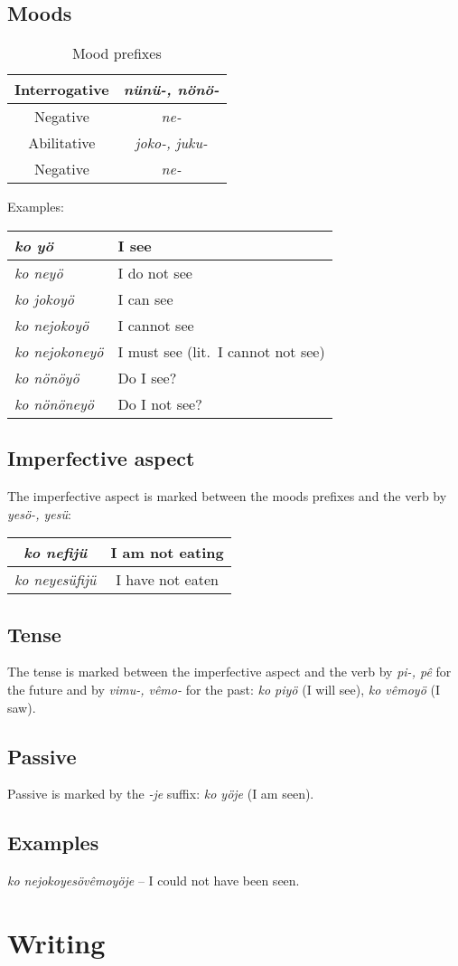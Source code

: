 \documentclass[a4paper]{article}
\begin{document}
\subsection{Moods}

\begin{table}[H]
\begin{tabular}{c | c}
Interrogative & \emph{n\"un\"u-, n\"on\"o-} \\
\hline
Negative & \emph{ne-} \\
\hline
Abilitative & \emph{joko-, juku-} \\
\hline
Negative & \emph{ne-}
\end{tabular}
\caption{Mood prefixes}
\end{table}

Examples:
\begin{table}[H]
\begin{tabular}{l | l}
\emph{ko y\"o} & I see \\
\hline
\emph{ko ney\"o} & I do not see \\
\hline
\emph{ko jokoy\"o} & I can see \\
\hline
\emph{ko nejokoy\"o} & I cannot see \\
\hline
\emph{ko nejokoney\"o} & I must see (lit.\ I cannot not see) \\
\hline
\emph{ko n\"on\"oy\"o} & Do I see? \\
\hline
\emph{ko n\"on\"oney\"o} & Do I not see?
\end{tabular}
\end{table}

\subsection{Imperfective aspect}

The imperfective aspect is marked between the moods prefixes and the verb by
\emph{yes\"o-, yes\"u}: 
\begin{tabular}{c | c}
\emph{ko nefij\"u} & I am not eating \\
\hline
\emph{ko neyes\"ufij\"u} & I have not eaten
\end{tabular} 

\subsection{Tense}

The tense is marked between the imperfective aspect and the verb by
\emph{pi-, p\^e} for the future and by \emph{vimu-, v\^emo-} for the past:
\emph{ko piy\"o} (I will see), \emph{ko v\^emoy\"o} (I saw).

\subsection{Passive}

Passive is marked by the \emph{-je} suffix: \emph{ko y\"oje} (I am seen).

\subsection{Examples}

\emph{ko nejokoyes\"ov\^emoy\"oje} -- I could not have been seen.

\section{Writing}
\end{document}
